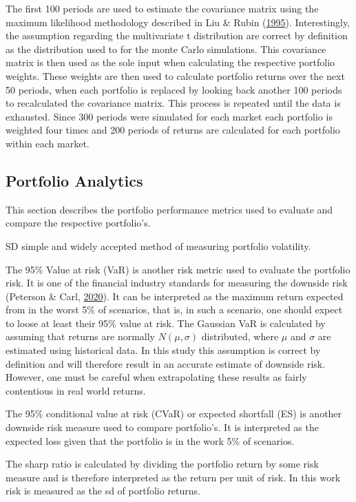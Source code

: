 \documentclass[11pt,preprint, authoryear]{elsarticle}
\numberwithin{equation}{section}
\numberwithin{figure}{section}
\numberwithin{table}{section}
\begin{document}
The first 100 periods are used to estimate the covariance matrix using
the maximum likelihood methodology described in Liu \& Rubin
(\protect\hyperlink{ref-liu1995}{1995}). Interestingly, the assumption
regarding the multivariate t distribution are correct by definition as
the distribution used to for the monte Carlo simulations. This
covariance matrix is then used as the sole input when calculating the
respective portfolio weights. These weights are then used to calculate
portfolio returns over the next 50 periods, when each portfolio is
replaced by looking back another 100 periods to recalculated the
covariance matrix. This process is repeated until the data is exhausted.
Since 300 periods were simulated for each market each portfolio is
weighted four times and 200 periods of returns are calculated for each
portfolio within each market.

\hypertarget{portfolio-analytics}{%
\subsection{Portfolio Analytics}\label{portfolio-analytics}}

This section describes the portfolio performance metrics used to
evaluate and compare the respective portfolio's.

SD simple and widely accepted method of measuring portfolio volatility.

The 95\% Value at risk (VaR) is another risk metric used to evaluate the
portfolio risk. It is one of the financial industry standards for
measuring the downside risk (Peterson \& Carl,
\protect\hyperlink{ref-PerformanceAnalytics}{2020}). It can be
interpreted as the maximum return expected from in the worst 5\% of
scenarios, that is, in such a scenario, one should expect to loose at
least their 95\% value at risk. The Gaussian VaR is calculated by
assuming that returns are normally \(N(\mu,\sigma)\) distributed, where
\(\mu\) and \(\sigma\) are estimated using historical data. In this
study this assumption is correct by definition and will therefore result
in an accurate estimate of downside risk. However, one must be careful
when extrapolating these results as fairly contentious in real world
returns.

The 95\% conditional value at risk (CVaR) or expected shortfall (ES) is
another downside risk measure used to compare portfolio's. It is
interpreted as the expected loss given that the portfolio is in the work
5\% of scenarios.

The sharp ratio is calculated by dividing the portfolio return by some
risk measure and is therefore interpreted as the return per unit of
risk. In this work risk is measured as the sd of portfolio returns.
\end{document}
